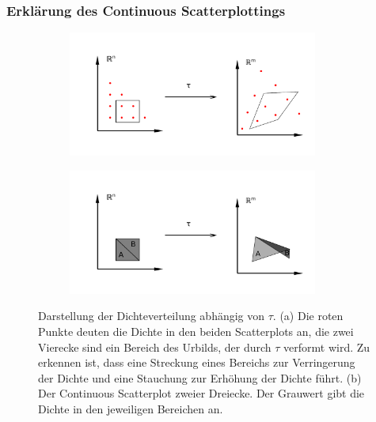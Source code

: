 \documentclass[a4paper,fontsize=12pt,toc=bib,halfparskip]{scrartcl}
\begin{document}
\subsubsection{Erkl\"arung des Continuous Scatterplottings}
\begin{figure}
	\centering
	\begin{subfigure}{0.45\textwidth}
		\includegraphics[width=0.9\textwidth]{pictures/ContinuousScatterplot}
		\subcaption{}
	\end{subfigure}
	\begin{subfigure}{0.45\textwidth}
		\includegraphics[width=0.9\textwidth]{pictures/Case2}
		\subcaption{}
		\label{Case2}
	\end{subfigure}
	\caption{Darstellung der Dichteverteilung abh\"angig von $\tau$. (a) Die roten Punkte deuten die Dichte in den beiden Scatterplots an, die zwei Vierecke sind ein Bereich des Urbilds, der durch $\tau$ verformt wird. Zu erkennen ist, dass eine Streckung eines Bereichs zur Verringerung der Dichte und eine Stauchung zur Erh\"ohung der Dichte f\"uhrt. (b) Der Continuous Scatterplot zweier Dreiecke. Der Grauwert gibt die Dichte in den jeweiligen Bereichen an.}
	\label{ContinuousScatterplot}
\end{figure}
\end{document}
